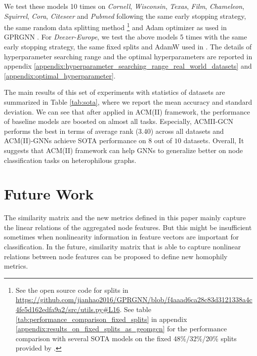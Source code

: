 \documentclass{article}
\newcommand{\0}{{\boldsymbol{0}}}
\newcommand{\6}{{\partial}}
\newcommand{\8}{{\infty}}
\newcommand{\4}{{\nabla}}
\begin{document}
We test these models 10 times on \textit{Cornell}, \textit{Wisconsin}, \textit{Texas}, \textit{Film}, \textit{Chameleon}, \textit{Squirrel}, \textit{Cora}, \textit{Citeseer} and \textit{Pubmed} following the same early stopping strategy, the same random data splitting method \footnote{See the open source code for splits in \url{https://github.com/jianhao2016/GPRGNN/blob/f4aaad6ca28c83d3121338a4c4fe5d162edfa9a2/src/utils.py\#L16}. See table \ref{tab:performance_comparison_fixed_splits} in appendix \ref{appendix:results_on_fixed_splits_as_geomgcn} for the performance comparison with several SOTA models on the fixed 48\%/32\%/20\% splits provided by \cite{pei2020geom}.} and Adam \cite{kingma2014adam} optimizer as used in GPRGNN \cite{chien2021adaptive}.  For \textit{Deezer-Europe}, we test the above models 5 times with the same early stopping strategy, the same fixed splits and AdamW \cite{loshchilov2017decoupled} used in \cite{lim2021new}. The details of hyperparameter searching range and the optimal hyperparameters are reported in appendix \ref{appendix:hyperparameter_searching_range_real_world_datasets} and \ref{appendix:optimal_hyperparameter}. 

The main results of this set of experiments with statistics of datasets are summarized in Table \ref{tab:sota}, where we report the mean accuracy and standard deviation. We can see that after applied in ACM(II) framework, the performance of baseline models are boosted on almost all tasks. Especially, ACMII-GCN performs the best in terms of average rank (3.40) across all datasets and ACM(II)-GNNs achieve SOTA performance on $8$ out of $10$ datasets. Overall, It suggests that ACM(II) framework can help GNNs to generalize better on node classification tasks on heterophilous graphs.







\section{Future Work}
\label{sec:futurework}
The similarity matrix and the new metrics defined in this paper mainly capture the linear relations of the aggregated node features. But this might be insufficient sometimes when nonlinearity information in feature vectors are important for classification. In the future, similarity matrix that is able to capture nonlinear relations between node features can be proposed to define new homophily metrics.
\end{document}
